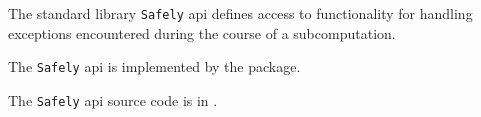 
The standard library {\tt Safely} api defines access to functionality for handling 
exceptions encountered during the course of a subcomputation.

The {\tt Safely} api is implemented by the  package.

The {\tt Safely} api source code is in .

